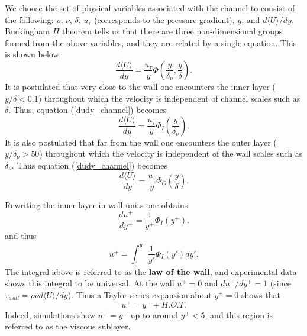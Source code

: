 \documentclass[oneside,a4paper,11pt]{report}
\begin{document}
We choose the set of physical variables associated with the channel to consist of the following: $\rho$, $\nu$, $\delta$, $u_{\tau}$ (corresponds to the pressure gradient), $y$, and $d \langle U \rangle/dy$. Buckingham $\Pi$ theorem tells us that there are three non-dimensional groups formed from the above variables, and they are related by a single equation. This is shown below
\begin{equation}
\label{dudy_channel}
\frac{d\langle U \rangle}{dy} = \frac{u_\tau}{y} \Phi \left ( \frac{y}{\delta_\nu}, \frac{y}{\delta} \right ).
\end{equation}
It is postulated that very close to the wall one encounters the inner layer ($y/\delta < 0.1$) throughout which the velocity is independent of channel scales such as $\delta$. Thus, equation (\ref{dudy_channel}) becomes
\begin{equation}
\label{inner_layer}
\frac{d\langle U \rangle}{dy} = \frac{u_\tau}{y} \Phi_I \left ( \frac{y}{\delta_\nu} \right ).
\end{equation}
It is also postulated that far from the wall one encounters the outer layer ($y/\delta_\nu > 50$) throughout which the velocity is independent of the wall scales such as $\delta_\nu$. Thus equation (\ref{dudy_channel}) becomes 
\begin{equation}
\label{outer_layer}
\frac{d\langle U \rangle}{dy} = \frac{u_\tau}{y} \Phi_O \left (\frac{y}{\delta} \right ).
\end{equation}

Rewriting the inner layer in wall units one obtains
\begin{equation}
\frac{d u^+}{dy^+} = \frac{1}{y^+} \Phi_I ( y^+ ).
\end{equation}
and thus
\begin{equation}
\label{law_wall}
u^+ = \int_0^{y^+} \frac{1}{y'} \Phi_I (y') dy'.
\end{equation}
The integral above is referred to as the \textbf{law of the wall}, and experimental data shows this integral to be universal. At the wall $u^+=0$ and $du^+/dy^+ = 1$ (since $\tau_{wall} = \rho \nu d\langle U \rangle/dy$). Thus a Taylor series expansion about $y^+=0$ shows that
\begin{equation}
u^+ = y^+ + H.O.T.
\end{equation}
Indeed, simulations show $u^+=y^+$ up to around $y^+ < 5$, and this region is referred to as the viscous sublayer.
\end{document}
